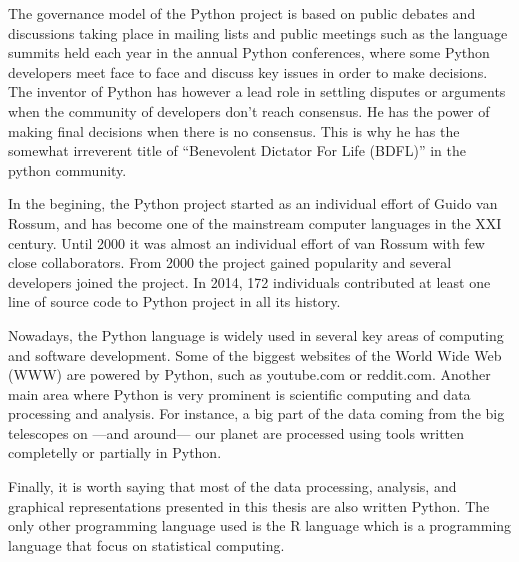 The governance model of the Python project is based on public debates and discussions taking place in mailing lists and public meetings such as the language summits held each year in the annual Python conferences, where some Python developers meet face to face and discuss key issues in order to make decisions. The inventor of Python has however a lead role in settling disputes or arguments when the community of developers don't reach consensus. He has the power of making final decisions when there is no consensus. This is why he has the somewhat irreverent title of ``Benevolent Dictator For Life (BDFL)'' in the python community. 

In the begining, the Python project started as an individual effort of Guido van Rossum, and has become one of the mainstream computer languages in the XXI century. Until 2000 it was almost an individual effort of van Rossum with few close collaborators. From 2000 the project gained popularity and several developers joined the project. In 2014, 172 individuals contributed at least one line of source code to Python project in all its history.

Nowadays, the Python language is widely used in several key areas of computing and software development. Some of the biggest websites of the World Wide Web (WWW) are powered by Python, such as youtube.com or reddit.com. Another main area where Python is very prominent is scientific computing and data processing and analysis. For instance, a big part of the data coming from the big telescopes on ---and around--- our planet are processed using tools written completelly or partially in Python.

Finally, it is worth saying that most of the data processing, analysis, and graphical representations presented in this thesis are also written Python. The only other programming language used is the R language which is a programming language that focus on statistical computing.
